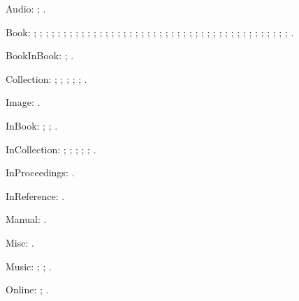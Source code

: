 \documentclass[a4paper,12pt]{report}
\begin{document}
Audio: \autocite{greek:filmstrip}; \autocite{weed:flatiron}.

Book: \autocite{barrows:reading}; \autocite{churchill:letters};
\autocite{cohen:schiff}; \autocite{cotton:manufacture};
\autocite{creasey:ashe:blast}; \autocite{creasey:morton:hide};
\autocite{creasey:york:death}; \autocite{davenport:attention};
\autocite{feydeau:farces}; \autocite{furet:passing:eng};
\autocite{furet:passing:fr}; \autocite{hopp:attalid};
\autocite{howell:marriage}; \autocite{lach:asia};
\autocite{lecarre:quest}; \autocite{levistrauss:savage};
\autocite{lynch:webstyle}; \autocite{maisonneuve:relations};
\autocite{mchugh:wake:15}; \autocite{menchu:crossing};
\autocite{meredith:letters}; \autocite{michelangelo:poems};
\autocite{mla:style}; \autocite{natrecoff:camera};
\autocite{palmatary:pottery}; \autocite{pelikan:christian};
\autocite{rodman:walk}; \autocite{schellinger:novel};
\autocite{sechzer:women}; \autocite{sereny:cries};
\autocite{soltes:georgia}; \autocite{stendhal:parma};
\autocite{suangtho:tectona}; \autocite{thompson:making};
\autocite{tillich:system}; \autocite{times:guide};
\autocite{turabian:manual}; \autocite{walker:columbia};
\autocite{wauchope:ceramics}; \autocite{weber:saugetiere};
\autocite{weresz}; \autocite{white:total};
\autocite{wright:evolution}; \autocite{wright:theory}.

BookInBook: \autocite{bernhard:boris}; \autocite{bernhard:ritter}.

Collection: \autocite{brush:ornithology};
\autocite{harley:cartography}; \autocite{harley:ancient:cart};
\autocite{kamrany:economic}; \autocite{prairie:state};
\autocite{zukowsky:chicago}.

Image: \autocite{bedford:photo}.

InBook: \autocite{ashbrook:brain}; \autocite{phibbs:diary};
\autocite{will:cohere}.

InCollection: \autocite{centinel:letters}; \autocite{ellet:galena};
\autocite{keating:dearborn}; \autocite{lippincott:chicago};
\autocite{sirosh:visualcortex}; \autocite{wiens:avian}.

InProceedings: \autocite{frede:inproc:trad}.

InReference: \autocite[absolute]{oed:cdrom}.

Manual: \autocite{dyna:browser}.

Misc: \autocite{roosevelt:speech:trad}.

Music: \autocite{floyd:atom}; \autocite{mozart:figaro};
\autocite{rubinstein:chopin}.

Online: \autocite{harwood:biden}; \autocite{powell:email}.
\end{document}
